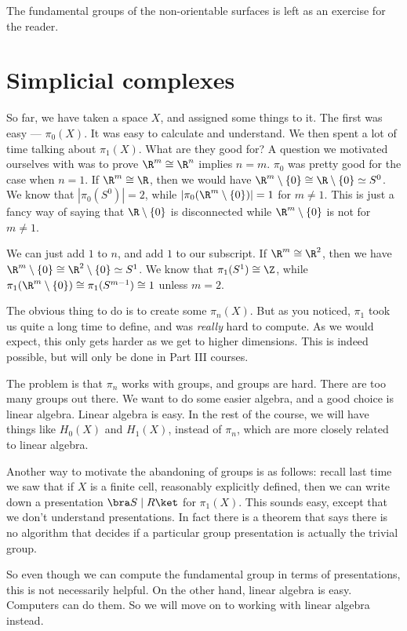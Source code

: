\documentclass[a4paper]{article}
\begin{document}
The fundamental groups of the non-orientable surfaces is left as an exercise for the reader. %

\section{Simplicial complexes}
So far, we have taken a space $X$, and assigned some things to it. The first was easy --- $\pi_0(X)$. It was easy to calculate and understand. We then spent a lot of time talking about $\pi_1(X)$. What are they good for? A question we motivated ourselves with was to prove $\R^m \cong \R^n$ implies $n = m$. $\pi_0$ was pretty good for the case when $n = 1$. If $\R^m \cong \R$, then we would have $\R^m \setminus \{0\} \cong \R\setminus \{0\} \simeq S^0$. We know that $|\pi_0(S^0)| = 2$, while $|\pi_0(\R^m \setminus \{0\})| = 1$ for $m \not= 1$. This is just a fancy way of saying that $\R \setminus \{0\}$ is disconnected while $\R^m \setminus \{0\}$ is not for $m \not= 1$.

We can just add $1$ to $n$, and add $1$ to our subscript. If $\R^m \cong \R^2$, then we have $\R^m \setminus \{0\} \cong \R^2 \setminus \{0\} \simeq S^1$. We know that $\pi_1(S^1) \cong \Z$, while $\pi_1(\R^m \setminus \{0\}) \cong \pi_1(S^{m - 1}) \cong 1$ unless $m = 2$.

The obvious thing to do is to create some $\pi_n(X)$. But as you noticed, $\pi_1$ took us quite a long time to define, and was \emph{really} hard to compute. As we would expect, this only gets harder as we get to higher dimensions. This is indeed possible, but will only be done in Part III courses.

The problem is that $\pi_n$ works with groups, and groups are hard. There are too many groups out there. We want to do some easier algebra, and a good choice is linear algebra. Linear algebra is easy. In the rest of the course, we will have things like $H_0(X)$ and $H_1(X)$, instead of $\pi_n$, which are more closely related to linear algebra.

Another way to motivate the abandoning of groups is as follows: recall last time we saw that if $X$ is a finite cell, reasonably explicitly defined, then we can write down a presentation $\bra S \mid R\ket$ for $\pi_1 (X)$. This sounds easy, except that we don't understand presentations. In fact there is a theorem that says there is no algorithm that decides if a particular group presentation is actually the trivial group.

So even though we can compute the fundamental group in terms of presentations, this is not necessarily helpful. On the other hand, linear algebra is easy. Computers can do them. So we will move on to working with linear algebra instead.
\end{document}
